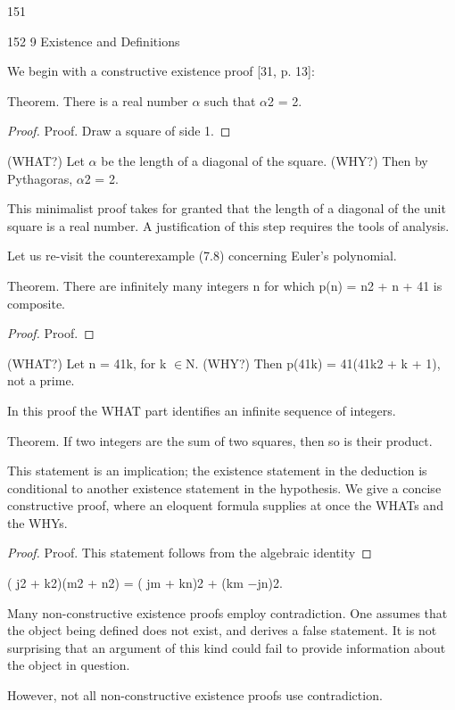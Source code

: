 \documentclass[11pt]{article}
\theoremstyle{plain}
\theoremstyle{definition}
\begin{document}
151

152 9 Existence and Definitions

We begin with a constructive existence proof [31, p. 13]:

Theorem. There is a real number $\alpha$ such that $\alpha$2 = 2.

\begin{proof}
Proof. Draw a square of side 1.
\end{proof}

(WHAT?) Let $\alpha$ be the length of a diagonal of the square. (WHY?) Then by Pythagoras, $\alpha$2 = 2. 

This minimalist proof takes for granted that the length of a diagonal of the unit square is a real number. A justification of this step requires the tools of analysis.

Let us re-visit the counterexample (7.8) concerning Euler's polynomial.

Theorem. There are infinitely many integers n for which p(n) = n2 + n + 41 is composite.

\begin{proof}
Proof.
\end{proof}

(WHAT?) Let n = 41k, for k $\in$N. (WHY?) Then p(41k) = 41(41k2 + k + 1), not a prime. 

In this proof the WHAT part identifies an infinite sequence of integers.

Theorem. If two integers are the sum of two squares, then so is their product.

This statement is an implication; the existence statement in the deduction is conditional to another existence statement in the hypothesis. We give a concise constructive proof, where an eloquent formula supplies at once the WHATs and the WHYs.

\begin{proof}
Proof. This statement follows from the algebraic identity
\end{proof}

( j2 + k2)(m2 + n2) = ( jm + kn)2 + (km $-$jn)2. 

Many non-constructive existence proofs employ contradiction. One assumes that the object being defined does not exist, and derives a false statement. It is not surprising that an argument of this kind could fail to provide information about the object in question.

However, not all non-constructive existence proofs use contradiction.
\end{document}
